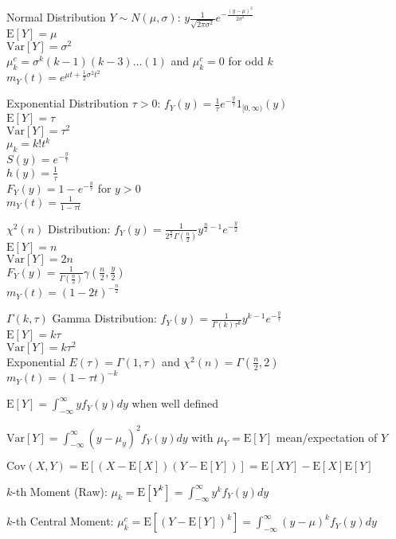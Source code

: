Normal Distribution $Y\sim N(\mu,\sigma)$: $y\frac{1}{\sqrt{2\pi\sigma^2}}e^{-\frac{(y-\mu)^2}{2\sigma^2}}$ \\
$\text{E}[Y]=\mu$ \\
$\text{Var}[Y]=\sigma^2$ \\
$\mu_k^c=\sigma^k(k-1)(k-3)\dots(1)$ and $\mu_k^c=0$ for odd $k$ \\
$m_Y(t)=e^{\mu t+ \frac{1}{2} \sigma^2 t^2}$ 

Exponential Distribution $\tau>0$: $f_Y(y)=\frac{1}{\tau}e^{-\frac{y}{\tau}}1_{[0,\infty)}(y)$ \\
$\text{E}[Y]=\tau$ \\
$\text{Var}[Y]=\tau^2$ \\
$\mu_k=k! t^k$ \\
$S(y)=e^{-\frac{y}{\tau}}$ \\
$h(y)=\frac{1}{\tau}$ \\
$F_Y(y)=1-e^{-\frac{y}{\tau}}$ for $y>0$ \\
$m_Y(t)=\frac{1}{1-\tau t}$

$\chi^2 (n)$ Distribution: $f_Y(y)=\frac{1}{2^{\frac{n}{2}} \Gamma (\frac{n}{2})} y^{\frac{n}{2}-1} e^{-\frac{y}{2}}$ \\
$\text{E}[Y]=n$ \\
$\text{Var}[Y]=2n$ \\
$F_Y(y)=\frac{1}{\Gamma (\frac{n}{2})} \gamma (\frac{n}{2},\frac{y}{2})$ \\
$m_Y(t)=(1-2t)^{-\frac{n}{2}}$

$\Gamma (k,\tau)$ Gamma Distribution: $f_Y(y)=\frac{1}{\Gamma (k) \tau^k} y^{k-1} e^{-\frac{y}{\tau}}$ \\
$\text{E}[Y]=k\tau$ \\
$\text{Var}[Y]=k\tau^2$ \\
Exponential $E(\tau)=\Gamma (1,\tau)$ and $\chi^2 (n)=\Gamma (\frac{n}{2},2)$ \\
$m_Y(t)=(1-\tau t)^{-k}$

$\text{E}[Y]=\int_{-\infty}^{\infty} yf_Y(y)dy$ when well defined

$\text{Var}[Y]=\int_{-\infty}^{\infty} (y-\mu_y)^2f_Y(y)dy$ with $\mu_Y=\text{E}[Y]$ mean/expectation of $Y$

$\text{Cov}(X,Y)=\text{E}[(X-\text{E}[X])(Y-\text{E}[Y])]=\text{E}[XY]-\text{E}[X]\text{E}[Y]$

$k$-th Moment (Raw): $\mu_k=\text{E}[Y^k]=\int_{-\infty}^{\infty}y^kf_Y(y)dy$

$k$-th Central Moment: $\mu_k^c=\text{E}[(Y-\text{E}[Y])^k]=\int_{-\infty}^{\infty}(y-\mu)^kf_Y(y)dy$

